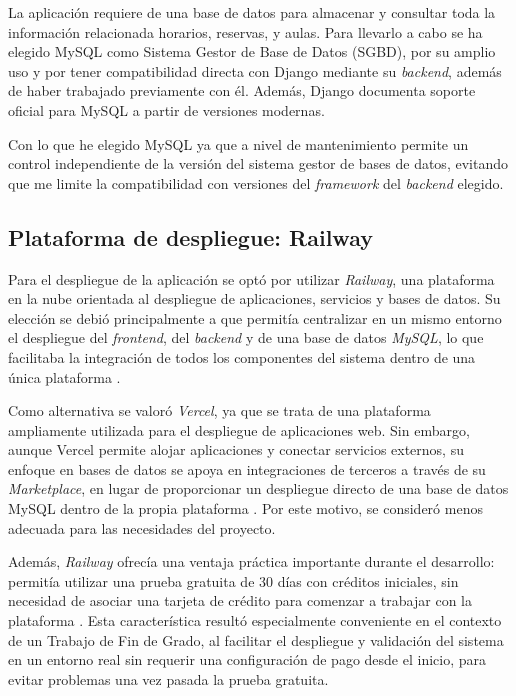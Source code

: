 La aplicación requiere de una base de datos para almacenar y consultar toda la información relacionada horarios, reservas, y aulas. Para llevarlo a cabo se ha elegido MySQL como Sistema Gestor de Base de Datos (SGBD), por su amplio uso y por tener compatibilidad directa con Django mediante su \textit{backend}, además de haber trabajado previamente con él. Además, Django documenta soporte oficial para MySQL a partir de versiones modernas.

Con lo que he elegido MySQL ya que a nivel de mantenimiento permite un control independiente de la versión del sistema gestor de bases de datos, evitando que me limite la compatibilidad con versiones del \textit{framework} del \textit{backend} elegido.

\subsection{Plataforma de despliegue: Railway}

Para el despliegue de la aplicación se optó por utilizar \textit{Railway}, una plataforma en la nube orientada al despliegue de aplicaciones, servicios y bases de datos. Su elección se debió principalmente a que permitía centralizar en un mismo entorno el despliegue del \textit{frontend}, del \textit{backend} y de una base de datos \textit{MySQL}, lo que facilitaba la integración de todos los componentes del sistema dentro de una única plataforma \cite{railway,railway:documentacion}.

Como alternativa se valoró \textit{Vercel}, ya que se trata de una plataforma ampliamente utilizada para el despliegue de aplicaciones web. Sin embargo, aunque Vercel permite alojar aplicaciones y conectar servicios externos, su enfoque en bases de datos se apoya en integraciones de terceros a través de su \textit{Marketplace}, en lugar de proporcionar un despliegue directo de una base de datos MySQL dentro de la propia plataforma \cite{vercel:almacenamiento,vercel:marketplace-bases-de-datos, vercel:planetscale}. Por este motivo, se consideró menos adecuada para las necesidades del proyecto.

Además, \textit{Railway} ofrecía una ventaja práctica importante durante el desarrollo: permitía utilizar una prueba gratuita de 30 días con créditos iniciales, sin necesidad de asociar una tarjeta de crédito para comenzar a trabajar con la plataforma \cite{railway:prueba-gratuita,railway:faqs-precios}. Esta característica resultó especialmente conveniente en el contexto de un Trabajo de Fin de Grado, al facilitar el despliegue y validación del sistema en un entorno real sin requerir una configuración de pago desde el inicio, para evitar problemas una vez pasada la prueba gratuita.

